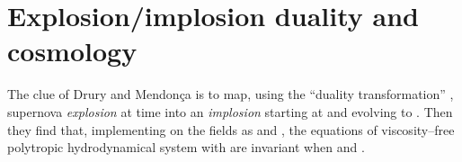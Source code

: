 \documentclass[11pt,a4paper]{article}
\let\ssection=\section
\renewcommand{\section}{\setcounter{equation}{0}\ssection}
\begin{document}
\section{Explosion/implosion duality and cosmology}

The clue of Drury and Mendon\c ca \cite{DM} is to map, using the ``duality
transformation''
 \coordHE{}, supernova
{\it explosion} at time \coordHE{}
into  an {\it implosion} starting at \coordHE{} and evolving to
\coordHE{}. Then they find that, implementing \myHighlight{$\Sigma$}\coordHE{} on the fields as
\coordHE{} and
\coordHE{},
the equations
of viscosity--free polytropic
hydrodynamical system with \coordHE{}
are  invariant when \coordHE{} and \coordHE{}.
\end{document}
